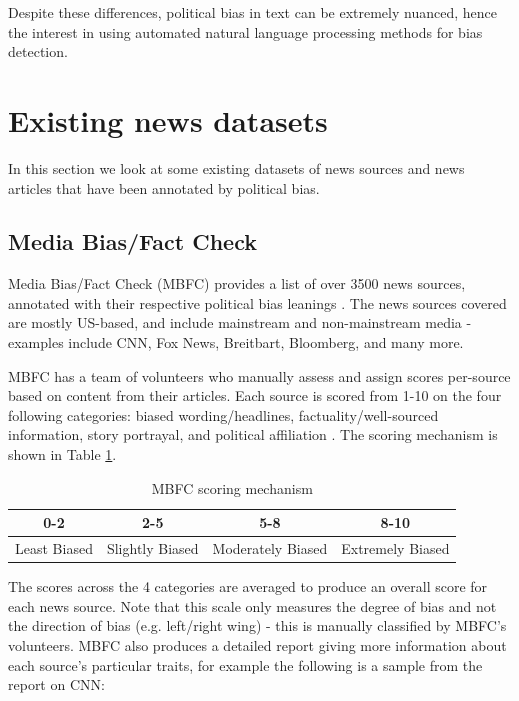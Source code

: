 Despite these differences, political bias in text can be extremely nuanced, hence the interest in using automated natural language processing methods for bias detection.

\section{Existing news datasets} \label{sec:existing-news-datasets}

In this section we look at some existing datasets of news sources and news articles that have been annotated by political bias.

\subsection{Media Bias/Fact Check}

Media Bias/Fact Check (MBFC) provides a list of over 3500 news sources, annotated with their respective political bias leanings \cite{mbfc}. The news sources covered are mostly US-based, and include mainstream and non-mainstream media - examples include CNN, Fox News, Breitbart, Bloomberg, and many more.

MBFC has a team of volunteers who manually assess and assign scores per-source based on content from their articles. Each source is scored from 1-10 on the four following categories: biased wording/headlines, factuality/well-sourced information, story portrayal, and political affiliation \cite{MBFC-methodology}. The scoring mechanism is shown in Table \ref{tab:MBFC-scoring}.

\begin{table}[ht]
    \centering
    \begin{tabular}{|c|c|c|c|}
        \hline
        0-2 & 2-5 & 5-8 & 8-10 \\
        \hline
        Least Biased & Slightly Biased & Moderately Biased & Extremely Biased \\
        \hline
    \end{tabular}
    \caption{MBFC scoring mechanism}
    \label{tab:MBFC-scoring}
\end{table}

The scores across the 4 categories are averaged to produce an overall score for each news source. Note that this scale only measures the degree of bias and not the direction of bias (e.g. left/right wing) - this is manually classified by MBFC's volunteers. MBFC also produces a detailed report giving more information about each source's particular traits, for example the following is a sample from the report on CNN:

